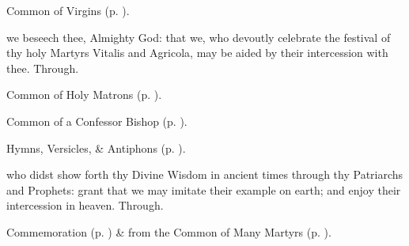 
\begin{rubric}
	Common of Virgins (p. \pageref{VirginMartyressesCollect}).
\end{rubric}


\clearpage
{}

\memorialCollect
{} we beseech thee, Almighty God: that we, who devoutly celebrate the festival of thy holy Martyrs Vitalis and Agricola, may be aided by their intercession with thee. Through.



\begin{rubric}
	Common of Holy Matrons (p. \pageref{CommonHolyMatronsCollect}).
\end{rubric}



\begin{rubric}
	Common of a Confessor Bishop (p. \pageref{ConfessorBishopCollect}).
\end{rubric}



\begin{rubric}
	Hymns, Versicles, \& Antiphons  (p. \pageref{AllHallows}).
\end{rubric}

 who didst show forth thy Divine Wisdom in ancient times through thy Patriarchs and Prophets: grant that we may imitate their example on earth; and enjoy their intercession in heaven. Through.

\begin{rubric}
	Commemoration  (p. \pageref{AllHallows}) \&  from the Common of Many Martyrs (p. \pageref{CommonMartyrsNotBishopsCollect}).
\end{rubric}



